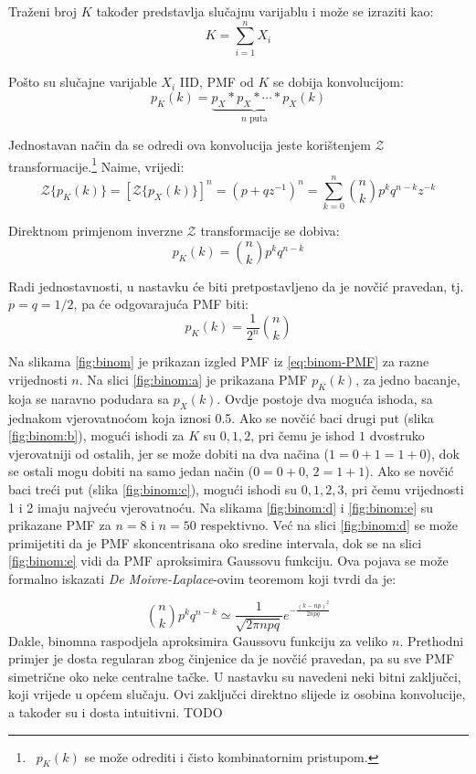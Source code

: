 Traženi broj $K$ također predstavlja slučajnu varijablu i može se izraziti
kao:
$$K = \sum_{i=1}^{n} X_i$$
\\

Pošto su slučajne varijable $X_i$ IID, PMF od $K$ se dobija konvolucijom:
$$p_K(k) = \underbrace{p_X * p_X * \cdots * p_X}_{n\text{ puta}}(k)$$

Jednostavan način da se odredi ova konvolucija jeste korištenjem
$\mathcal{Z}$ transformacije.\footnote{\ $p_K(k)$ se može odrediti i čisto
kombinatornim pristupom.}
Naime, vrijedi: %
\begin{equation}
  \mathcal{Z}\{p_K(k)\}
  = \left[\mathcal{Z}\{p_X(k)\}\right]^n
  = (p+qz^{-1})^n
  = \sum_{k=0}^{n} \binom{n}{k} p^k q^{n-k} z^{-k}
\end{equation}

Direktnom primjenom inverzne $ \mathcal{Z}$ transformacije se dobiva:
\begin{equation}
  p_K(k) = \binom{n}{k} p^kq^{n-k}
\end{equation}

Radi jednostavnosti, u nastavku će biti pretpostavljeno da je novčić pravedan,
tj. $p=q=1/2$, pa će odgovarajuća PMF biti:
\begin{equation} \label{eq:binom-PMF}
  p_K(k) = \frac{1}{2^n} \binom{n}{k}
\end{equation}

Na slikama \ref{fig:binom} je prikazan izgled PMF iz \eqref{eq:binom-PMF} za
razne vrijednosti $n$.  Na slici \ref{fig:binom:a} je prikazana PMF $p_K(k)$, za
jedno bacanje, koja se naravno podudara sa $p_X(k)$. Ovdje postoje dva moguća
ishoda, sa jednakom vjerovatnoćom koja iznosi 0.5. Ako se novčić baci drugi put
(slika \ref{fig:binom:b}), mogući ishodi za $K$ su $0, 1, 2$, pri čemu je ishod
$1$ dvostruko vjerovatniji od ostalih, jer se može dobiti na dva načina
($1=0+1=1+0$), dok se ostali mogu dobiti na samo jedan način ($0=0+0$, $2=1+1$).
Ako se novčić baci treći put (slika \ref{fig:binom:c}), mogući ishodi su
$0,1,2,3$, pri čemu vrijednosti 1 i 2 imaju najveću vjerovatnoću. Na slikama
\ref{fig:binom:d} i \ref{fig:binom:e} su prikazane PMF za $n=8$ i $n=50$
respektivno. Već na slici \ref{fig:binom:d} se može primijetiti da je PMF
skoncentrisana oko sredine intervala, dok se na slici \ref{fig:binom:e} vidi da
PMF aproksimira Gaussovu funkciju. Ova pojava se može formalno iskazati
\textit{De Moivre-Laplace}-ovim teoremom koji tvrdi da je:

\begin{equation}
  \binom{n}{k}p^kq^{n-k} \simeq \frac{1}{\sqrt{2\pi npq}}
  e^{-\frac{(k-np)^2}{2npq}}
\end{equation}
Dakle, binomna raspodjela aproksimira Gaussovu funkciju za veliko $n$.
Prethodni primjer je dosta regularan zbog činjenice da je novčić pravedan, pa su
sve PMF simetrične oko neke centralne tačke. U nastavku su navedeni neki bitni
zaključci, koji vrijede u općem slučaju. Ovi zaključci direktno slijede iz
osobina konvolucije, a također su i dosta intuitivni.
TODO

